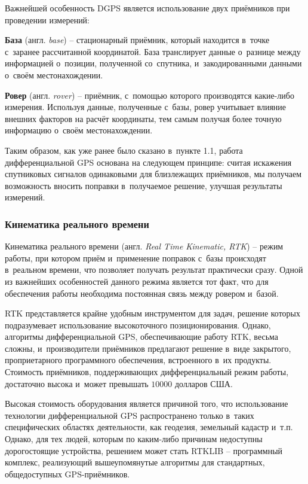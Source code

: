 Важнейшей особенность DGPS является использование двух приёмников при проведении измерений:

\begin{dashitemize}
  \item \textbf{База} (англ. \emph{base}) -- стационарный приёмник, который находится в~точке с~заранее рассчитанной координатой. База транслирует данные о~разнице между информацией о~позиции, полученной со~спутника, и~закодированными данными о~своём местонахождении.
  \item \textbf{Ровер} (англ. \emph{rover}) -- приёмник, с~помощью которого производятся какие-либо измерения. Используя данные, полученные с~базы, ровер учитывает влияние внешних факторов на расчёт координаты, тем самым получая более точную информацию о~своём местонахождении.
\end{dashitemize}

Таким образом, как уже ранее было сказано в~пункте 1.1, работа дифференциальной GPS основана на следующем принципе: считая искажения спутниковых сигналов одинаковыми для близлежащих приёмников, мы получаем возможность вносить поправки в~получаемое решение, улучшая результаты измерений.

\subsubsection{Кинематика реального времени}

Кинематика реального времени (англ. \emph{Real Time Kinematic, RTK}) -- режим работы, при котором приём и~применение поправок с~базы происходят в~реальном времени, что позволяет получать результат практически сразу. Одной из важнейших особенностей данного режима является тот факт, что для обеспечения работы необходима постоянная связь между ровером и~базой. \par

RTK представляется крайне удобным инструментом для задач, решение которых подразумевает использование высокоточного позиционирования. Однако, алгоритмы дифференциальной GPS, обеспечивающие работу RTK, весьма сложны, и~производители приёмников предлагают решение в~виде закрытого, проприетарного программного обеспечения, встроенного в~их продукты. Стоимость приёмников, поддерживающих дифференциальный режим работы, достаточно высока и~может превышать $10000$ долларов США. \par

Высокая стоимость оборудования является причиной того, что использование технологии дифференциальной GPS распространено только в~таких специфических областях деятельности, как геодезия, земельный кадастр и~т.п. Однако, для тех людей, которым по каким-либо причинам недоступны дорогостоящие устройства, решением может стать RTKLIB -- программный комплекс, реализующий вышеупомянутые алгоритмы для стандартных, общедоступных GPS-приёмников.

